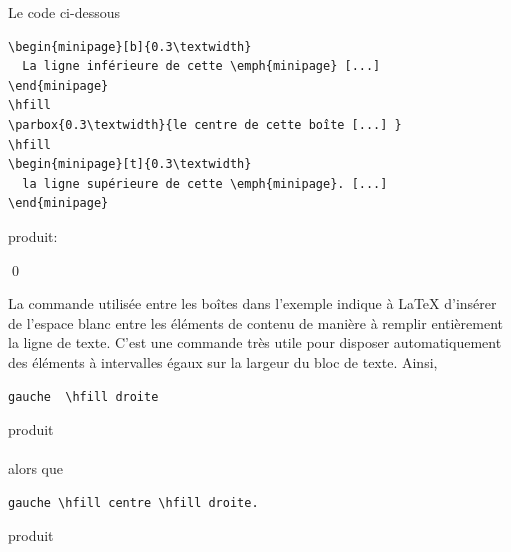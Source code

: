 \begin{exemple}
  Le code ci-dessous
\begin{lstlisting}
\begin{minipage}[b]{0.3\textwidth}
  La ligne inférieure de cette \emph{minipage} [...]
\end{minipage}
\hfill
\parbox{0.3\textwidth}{le centre de cette boîte [...] }
\hfill
\begin{minipage}[t]{0.3\textwidth}
  la ligne supérieure de cette \emph{minipage}. [...]
\end{minipage}
\end{lstlisting}
  produit: \\[0.5\baselineskip]
  \begin{minipage}{\textwidth}
    \makebox[0pt][l]{\color{lightgray}\rule{\textwidth}{0.7pt}}\relax
     \hfill {}
    \hfill {}
  \end{minipage}
  \qed
\end{exemple}

La commande \cmd{\hfill} utilisée entre les boîtes dans l'exemple
indique à {\LaTeX} d'insérer de l'espace blanc entre les éléments de
contenu de manière à remplir entièrement la ligne de texte. C'est une
commande très utile pour disposer automatiquement des éléments à
intervalles égaux sur la largeur du bloc de texte. Ainsi,
\begin{lstlisting}
gauche  \hfill droite
\end{lstlisting}
produit \\[0.5\baselineskip]
 \\[0.5\baselineskip]
alors que
\begin{lstlisting}
gauche \hfill centre \hfill droite.
\end{lstlisting}
produit \\[0.5\baselineskip]

